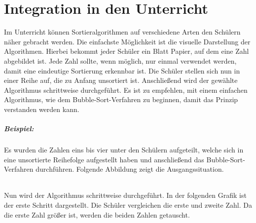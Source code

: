 \documentclass[./entry.tex]{subfiles}
\begin{document}
    \chapter{Integration in den Unterricht}

    Im Unterricht können Sortieralgorithmen auf verschiedene Arten den Schülern näher gebracht werden.
    Die einfachste Möglichkeit ist die visuelle Darstellung der Algorithmen.
    Hierbei bekommt jeder Schüler ein Blatt Papier, auf dem eine Zahl abgebildet ist.
    Jede Zahl sollte, wenn möglich, nur einmal verwendet werden, damit eine eindeutige Sortierung erkennbar ist.
    Die Schüler stellen sich nun in einer Reihe auf, die zu Anfang unsortiert ist.
    Anschließend wird der gewählte Algorithmus schrittweise durchgeführt.
    Es ist zu empfehlen, mit einem einfachen Algorithmus, wie dem \dq Bubble-Sort\dq-Verfahren zu beginnen,
    damit das Prinzip verstanden werden kann.

    \paragraph{Beispiel:}
    Es wurden die Zahlen eins bis vier unter den Schülern aufgeteilt, welche sich in eine
    unsortierte Reihefolge aufgestellt haben und anschließend das \dq Bubble-Sort\dq-Verfahren
    durchführen. Folgende Abbildung zeigt die Ausgangssituation.
    \vspace{0.5cm}

    \\
    Nun wird der Algorithmus schrittweise durchgeführt.
    In der folgenden Grafik ist der erste Schritt dargestellt.
    Die Schüler vergleichen die erste und zweite Zahl.
    Da die erste Zahl größer ist, werden die beiden Zahlen getauscht.
    \vspace{0.5cm}
\end{document}
